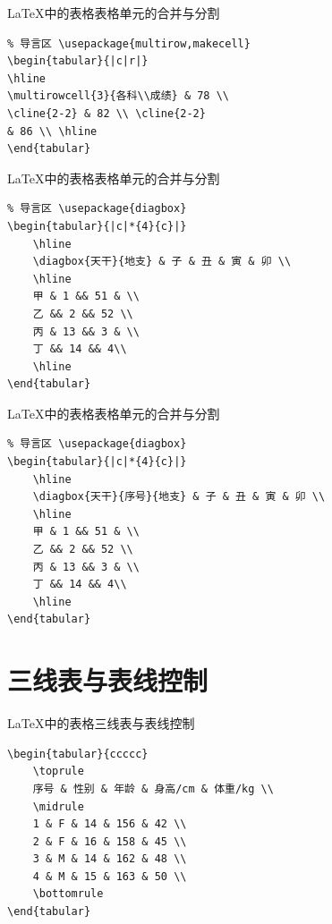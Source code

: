 \documentclass[11pt]{beamer}
\begin{document}
\begin{frame}[fragile]{\LaTeX 中的表格}{表格单元的合并与分割}
\begin{lstlisting}
% 导言区 \usepackage{multirow,makecell}
\begin{tabular}{|c|r|}
\hline
\multirowcell{3}{各科\\成绩} & 78 \\
\cline{2-2} & 82 \\ \cline{2-2}
& 86 \\ \hline
\end{tabular}
\end{lstlisting}
\end{frame}

\begin{frame}[fragile]{\LaTeX 中的表格}{表格单元的合并与分割}
\begin{lstlisting}
% 导言区 \usepackage{diagbox}
\begin{tabular}{|c|*{4}{c}|}
	\hline
	\diagbox{天干}{地支} & 子 & 丑 & 寅 & 卯 \\
	\hline
	甲 & 1 && 51 & \\
	乙 && 2 && 52 \\
	丙 & 13 && 3 & \\
	丁 && 14 && 4\\
	\hline
\end{tabular}
\end{lstlisting}
\end{frame}

\begin{frame}[fragile]{\LaTeX 中的表格}{表格单元的合并与分割}
\begin{lstlisting}
% 导言区 \usepackage{diagbox}
\begin{tabular}{|c|*{4}{c}|}
	\hline
	\diagbox{天干}{序号}{地支} & 子 & 丑 & 寅 & 卯 \\
	\hline
	甲 & 1 && 51 & \\
	乙 && 2 && 52 \\
	丙 & 13 && 3 & \\
	丁 && 14 && 4\\
	\hline
\end{tabular}
\end{lstlisting}
\end{frame}

\section{三线表与表线控制}

\begin{frame}[fragile]{\LaTeX 中的表格}{三线表与表线控制}
\begin{lstlisting}
\begin{tabular}{ccccc}
	\toprule
	序号 & 性别 & 年龄 & 身高/cm & 体重/kg \\
	\midrule
	1 & F & 14 & 156 & 42 \\
	2 & F & 16 & 158 & 45 \\
	3 & M & 14 & 162 & 48 \\
	4 & M & 15 & 163 & 50 \\
	\bottomrule
\end{tabular}
\end{lstlisting}
\end{frame}
\end{document}
